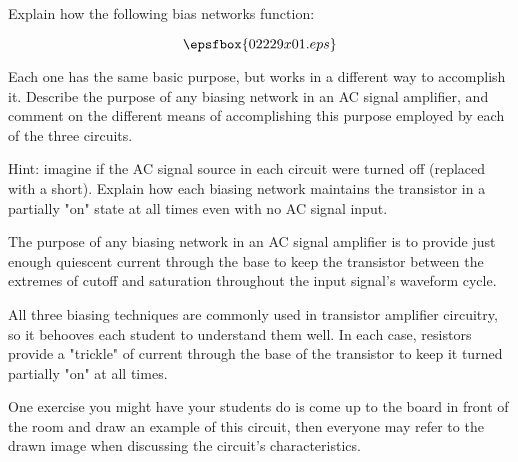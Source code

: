 

Explain how the following bias networks function:

$$\epsfbox{02229x01.eps}$$

Each one has the same basic purpose, but works in a different way to accomplish it.  Describe the purpose of any biasing network in an AC signal amplifier, and comment on the different means of accomplishing this purpose employed by each of the three circuits.

\vskip 10pt

Hint: imagine if the AC signal source in each circuit were turned off (replaced with a short).  Explain how each biasing network maintains the transistor in a partially "on" state at all times even with no AC signal input.







The purpose of any biasing network in an AC signal amplifier is to provide just enough quiescent current through the base to keep the transistor between the extremes of cutoff and saturation throughout the input signal's waveform cycle.







All three biasing techniques are commonly used in transistor amplifier circuitry, so it behooves each student to understand them well.  In each case, resistors provide a "trickle" of current through the base of the transistor to keep it turned partially "on" at all times.

One exercise you might have your students do is come up to the board in front of the room and draw an example of this circuit, then everyone may refer to the drawn image when discussing the circuit's characteristics.




